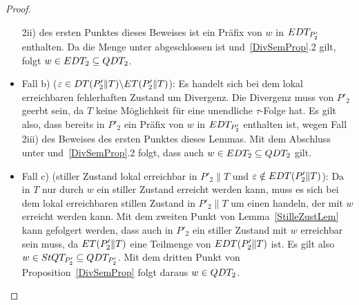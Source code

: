 \begin{proof}
\begin{itemize}
      2ii) des ersten Punktes dieses Beweises ist ein Präfix von $w$ in $EDT
      _{P'_2}$ enthalten. Da die Menge \EDT{} unter \cont{} abgeschlossen ist
      und~\ref{DivSemProp}.2 gilt, folgt $w\in EDT _2\subseteq QDT _2$.
    \item Fall b) ($\varepsilon \in DT (P'_2\|T)\backslash ET(P'_2\|T)$): Es
      handelt sich bei dem lokal erreichbaren fehlerhaften Zustand um
      Divergenz. Die Divergenz muss von $P'_2$ geerbt sein, da $T$ keine
      Möglichkeit für eine unendliche $\tau$-Folge hat. Es gilt also, dass
      bereits in $P'_2$ ein Präfix von $w$ in $EDT _{P'_2}$ enthalten ist,
      wegen Fall 2iii) des Beweises des ersten Punktes dieses Lemmas. Mit dem
      Abschluss unter \cont{} und~\ref{DivSemProp}.2 folgt, dass auch $w\in
      EDT _2\subseteq QDT _2$ gilt.
    \item Fall c) (stiller Zustand lokal erreichbar in $P'_2\|T$ und $\varepsilon
      \notin EDT (P'_2\|T)$): Da in $T$ nur durch $w$ ein stiller Zustand
      erreicht werden kann, muss es sich bei dem lokal erreichbaren
      stillen Zustand in $P'_2\|T$ um einen handeln, der mit $w$ erreicht werden
      kann. Mit dem zweiten Punkt von Lemma~\ref{StilleZustLem} kann gefolgert
      werden, dass auch in $P'_2$ ein stiller Zustand mit $w$ erreichbar sein
      muss, da $ET (P'_2\|T)$ eine Teilmenge von $EDT (P'_2\|T)$ ist. Es gilt
      also $w\in StQT _{P'_2}\subseteq QDT _{P'_2}$. Mit dem dritten Punkt von
      Proposition~\ref{DivSemProp} folgt daraus $w\in QDT _2$.
  \end{itemize}


\end{proof}
